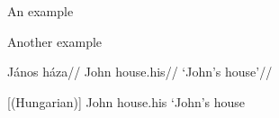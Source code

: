 \documentclass{article}
\begin{document}
\begin{examples}
\item An example
\item Another example
\end{examples}
\begin{subexamples}
\item	\begingl
    \gla{}János háza//
    \glb John house.his//
    \glft `John's house'//
    \endgl
\item {}[(Hungarian)]
			  {John house.his}
			  {`John's house}
\end{subexamples}
\end{document}

